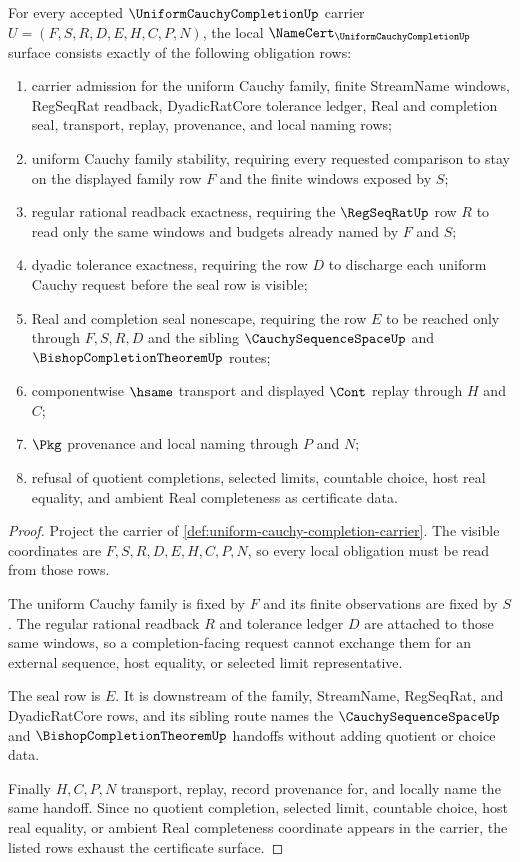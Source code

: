 \begin{theorem}
\label{thm:uniform-cauchy-completion-namecert-obligations}
For every accepted $\UniformCauchyCompletionUp$ carrier $U=(F,S,R,D,E,H,C,P,N)$, the local $\NameCert_{\UniformCauchyCompletionUp}$ surface consists exactly of the following obligation rows:
\begin{enumerate}
\item carrier admission for the uniform Cauchy family, finite StreamName windows, RegSeqRat readback, DyadicRatCore tolerance ledger, Real and completion seal, transport, replay, provenance, and local naming rows;
\item uniform Cauchy family stability, requiring every requested comparison to stay on the displayed family row $F$ and the finite windows exposed by $S$;
\item regular rational readback exactness, requiring the $\RegSeqRatUp$ row $R$ to read only the same windows and budgets already named by $F$ and $S$;
\item dyadic tolerance exactness, requiring the row $D$ to discharge each uniform Cauchy request before the seal row is visible;
\item Real and completion seal nonescape, requiring the row $E$ to be reached only through $F,S,R,D$ and the sibling $\CauchySequenceSpaceUp$ and $\BishopCompletionTheoremUp$ routes;
\item componentwise $\hsame$ transport and displayed $\Cont$ replay through $H$ and $C$;
\item $\Pkg$ provenance and local naming through $P$ and $N$;
\item refusal of quotient completions, selected limits, countable choice, host real equality, and ambient Real completeness as certificate data.
\end{enumerate}
\end{theorem}
\begin{proof}
Project the carrier of \autoref{def:uniform-cauchy-completion-carrier}. The visible coordinates are $F,S,R,D,E,H,C,P,N$, so every local obligation must be read from those rows.

The uniform Cauchy family is fixed by $F$ and its finite observations are fixed by $S$. The regular rational readback $R$ and tolerance ledger $D$ are attached to those same windows, so a completion-facing request cannot exchange them for an external sequence, host equality, or selected limit representative.

The seal row is $E$. It is downstream of the family, StreamName, RegSeqRat, and DyadicRatCore rows, and its sibling route names the $\CauchySequenceSpaceUp$ and $\BishopCompletionTheoremUp$ handoffs without adding quotient or choice data.

Finally $H,C,P,N$ transport, replay, record provenance for, and locally name the same handoff. Since no quotient completion, selected limit, countable choice, host real equality, or ambient Real completeness coordinate appears in the carrier, the listed rows exhaust the certificate surface.
\end{proof}

